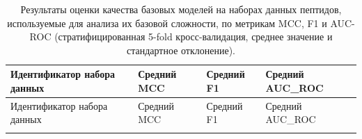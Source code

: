\documentclass[specification,annotation,times]{itmo-student-thesis}
\begin{document}
\small
\begin{longtable}{
| >{\centering\arraybackslash}p{3cm}
| >{\centering\arraybackslash}p{4cm}
| >{\centering\arraybackslash}p{4cm}
| >{\centering\arraybackslash}p{4cm} |
}

\caption{Результаты оценки качества базовых моделей на наборах данных пептидов, используемые для анализа их базовой сложности, по метрикам MCC, F1 и AUC-ROC (стратифицированная 5-fold кросс-валидация, среднее значение и стандартное отклонение).}
\label{tab:metrics_comparison} \\

\hline
Идентификатор набора данных 
& Средний MCC 
& Средний F1 
& Средний AUC\_ROC \\
\hline
\endfirsthead

\hline
Идентификатор набора данных 
& Средний MCC 
& Средний F1 
& Средний AUC\_ROC \\
\hline
\endhead

\hline
\endfoot

\hline
\endlastfoot


\end{longtable}
\end{document}
